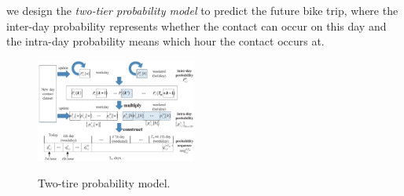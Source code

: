 we design the {\it two-tier probability model} to
predict the future bike trip,
where the inter-day probability represents
whether the contact can occur on this day
and the intra-day probability means which hour the contact occurs at.
\begin{figure}
  \centering
  {\includegraphics[width=0.47\textwidth]{fig/twotierprob.eps}}
     \caption{Two-tire probability model.}
     \label{fig:ttpm}
\end{figure}

